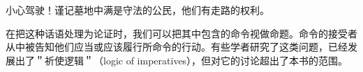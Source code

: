 \begin{displayquote}
小心驾驶！谨记墓地中满是守法的公民，他们有走路的权利。\cite{lander1988}
\end{displayquote}

在把这种话语处理为论证时，我们可以把其中包含的命令视做命题。命令的接受者从中被告知他们应当或应该履行所命令的行动。有些学者研究了这类问题，已经发展出了＂祈使逻辑＂（logic of imperatives），但对它的讨论超出了本书的范围。\cite{rescher1996} 

\begin{center}
\end{center} 